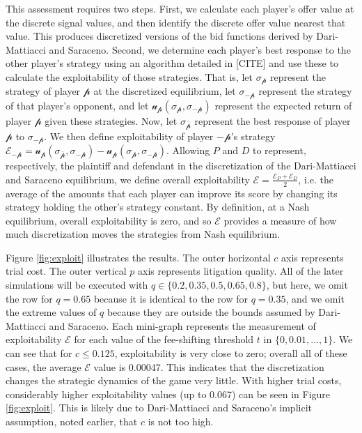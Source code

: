 \documentclass{article}
\begin{document}
This assessment requires two steps. First, we calculate each player's offer value at the discrete signal values, and then identify the discrete offer value nearest that value. This produces discretized versions of the bid functions derived by Dari-Mattiacci and Saraceno. Second, we determine each player's best response to the other player's strategy using an algorithm detailed in [CITE] and use these to calculate the exploitability of those strategies. That is, let $\sigma_{\mathcal{p}}$ represent the strategy of player $\mathcal{p}$ at the discretized equilibrium, let $\sigma_{-\mathcal{p}}$ represent the strategy of that player's opponent, and let $\mathcal{u}_{\mathcal{p}}(\sigma_{\mathcal{p}}, \sigma_{-\mathcal{p}})$ represent the expected return of player $\mathcal{p}$ given these strategies. Now, let $\sigma_{\overline{\mathcal{p}}}$ represent the best response of player $\mathcal{p}$ to $\sigma_{-\mathcal{p}}$. We then define exploitability of player $-\mathcal{p}$'s strategy $\mathcal{E}_{-\mathcal{p}} = \mathcal{u}_{\mathcal{p}}(\sigma_{\mathcal{\overline{p}}}, \sigma_{-\mathcal{p}}) - \mathcal{u}_{\mathcal{p}}(\sigma_{\mathcal{p}}, \sigma_{-\mathcal{p}})$. Allowing $P$ and $D$ to represent, respectively, the plaintiff and defendant in the discretization of the Dari-Mattiacci and Saraceno equilibrium, we define overall exploitability $\mathcal{E} = \frac{\mathcal{E}_P + \mathcal{E}_D}{2}$, i.e. the average of the amounts that each player can improve its score by changing its strategy holding the other's strategy constant. By definition, at a Nash equilibrium, overall exploitability is zero, and so $\mathcal{E}$ provides a measure of how much discretization moves the strategies from Nash equilibrium. 

Figure \ref{fig:exploit} illustrates the results. The outer horizontal $c$ axis represents trial cost. The outer vertical $p$ axis represents litigation quality. All of the later simulations will be executed with $q \in \{ 0.2, 0.35, 0.5, 0.65, 0.8 \}$, but here, we omit the row for $q = 0.65$ because it is identical to the row for $q = 0.35$, and we omit the extreme values of $q$ because they are outside the bounds assumed by Dari-Mattiacci and Saraceno. Each mini-graph represents the measurement of exploitability $\mathcal{E}$ for each value of the fee-shifting threshold $t$ in $\{0, 0.01, ... , 1\}$. We can see that for $c \leq 0.125$, exploitability is very close to zero; overall all of these cases, the average $\mathcal{E}$ value is 0.00047. This indicates that the discretization changes the strategic dynamics of the game very little. With higher trial costs, considerably higher exploitability values (up to 0.067) can be seen in Figure \ref{fig:exploit}. This is likely due to Dari-Mattiacci and Saraceno's implicit assumption, noted earlier, that $c$ is not too high.
\end{document}
